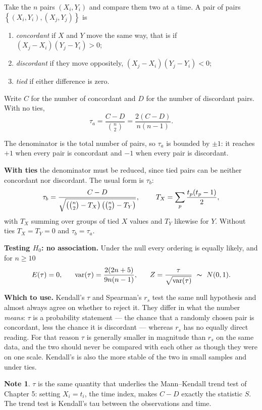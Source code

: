 \documentclass[11pt,a4paper]{article}
\theoremstyle{definition}
\newtheorem{note}[thm]{Note}
\begin{document}
Take the $n$ pairs $(X_i, Y_i)$ and compare them two at a time. A pair of pairs
$\left\{(X_i,Y_i),(X_j,Y_j)\right\}$ is
\begin{enumerate}
\item[(i).] \emph{concordant} if $X$ and $Y$ move the same way, that is if
$(X_j - X_i)(Y_j - Y_i) > 0$;
\item[(ii).] \emph{discordant} if they move oppositely, $(X_j - X_i)(Y_j - Y_i) < 0$;
\item[(iii).] \emph{tied} if either difference is zero.
\end{enumerate}
Write $C$ for the number of concordant and $D$ for the number of discordant
pairs. With no ties,
$$\tau_a = \dfrac{C - D}{\binom{n}{2}} = \dfrac{2(C - D)}{n(n-1)} .$$

The denominator is the total number of pairs, so $\tau_a$ is bounded by $\pm 1$:
it reaches $+1$ when every pair is concordant and $-1$ when every pair is
discordant.

\textbf{With ties} the denominator must be reduced, since tied pairs can be
neither concordant nor discordant. The usual form is $\tau_b$:
$$\tau_b = \dfrac{C - D}{\sqrt{\left(\binom{n}{2} - T_X\right)
\left(\binom{n}{2} - T_Y\right)}},
\hspace{0.8cm} T_X = \sum_{p}\dfrac{t_p(t_p - 1)}{2},$$
with $T_X$ summing over groups of tied $X$ values and $T_Y$ likewise for $Y$.
Without ties $T_X = T_Y = 0$ and $\tau_b = \tau_a$.

\textbf{Testing $H_0$: no association.} Under the null every ordering is equally
likely, and for $n \geq 10$
$$E(\tau) = 0, \hspace{0.6cm}
\operatorname{var}(\tau) = \dfrac{2(2n+5)}{9n(n-1)},
\hspace{0.6cm} Z = \dfrac{\tau}{\sqrt{\operatorname{var}(\tau)}}
\ \thicksim\ N(0,1).$$

\textbf{Which to use.} Kendall's $\tau$ and Spearman's $r_s$ test the same null
hypothesis and almost always agree on whether to reject it. They differ in what
the number \emph{means}: $\tau$ is a probability statement --- the chance that a
randomly chosen pair is concordant, less the chance it is discordant --- whereas
$r_s$ has no equally direct reading. For that reason $\tau$ is generally smaller
in magnitude than $r_s$ on the same data, and the two should never be compared
with each other as though they were on one scale. Kendall's is also the more
stable of the two in small samples and under ties.

\begin{note}
$\tau$ is the same quantity that underlies the Mann--Kendall trend test of
Chapter 5: setting $X_i = t_i$, the time index, makes $C - D$ exactly the
statistic $S$. The trend test is Kendall's tau between the observations and time.
\end{note}
\end{document}
